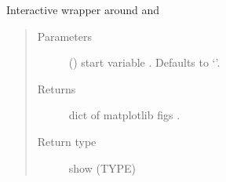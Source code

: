\documentclass[letterpaper,10pt,english]{sphinxmanual}
\begin{document}
\begin{fulllineitems}
\begin{fulllineitems}
\label{\detokenize{index:modelclass.Dekomp_Mixin.get_dekom_gui}}
\pysigstartsignatures
{}
\pysigstopsignatures
\sphinxAtStartPar
Interactive wrapper around {\hyperref[\detokenize{index:modelclass.Dekomp_Mixin.dekomp_plot}]{}} and {\hyperref[\detokenize{index:modelclass.Dekomp_Mixin.dekomp_plot_per}]{}}
\begin{quote}\begin{description}
\item[{Parameters}] \leavevmode
\sphinxAtStartPar
{} (\sphinxstyleliteralemphasis{\sphinxupquote{, }}) \textendash{} start variable . Defaults to ‘’.

\item[{Returns}] \leavevmode
\sphinxAtStartPar
dict of matplotlib figs .

\item[{Return type}] \leavevmode
\sphinxAtStartPar
show (TYPE)

\end{description}\end{quote}

\end{fulllineitems}



\end{fulllineitems}
\end{document}
